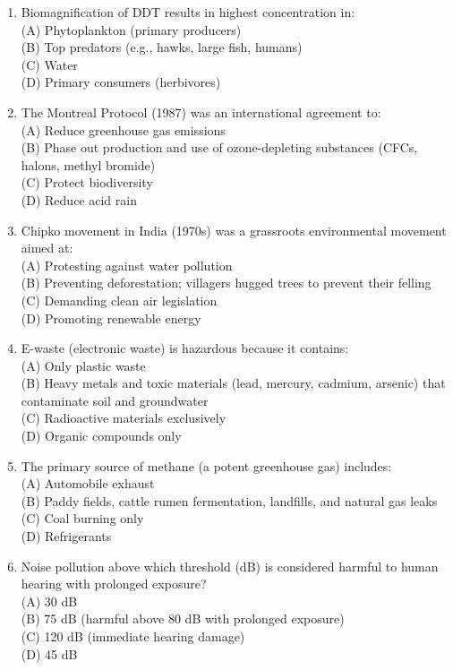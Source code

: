 \documentclass{article}
\begin{document}
\begin{enumerate}[label=Q\arabic*.]
\item Biomagnification of DDT results in highest concentration in:
\\(A) Phytoplankton (primary producers)
\\(B) Top predators (e.g., hawks, large fish, humans)
\\(C) Water
\\(D) Primary consumers (herbivores)

\item The Montreal Protocol (1987) was an international agreement to:
\\(A) Reduce greenhouse gas emissions
\\(B) Phase out production and use of ozone-depleting substances (CFCs, halons, methyl bromide)
\\(C) Protect biodiversity
\\(D) Reduce acid rain

\item Chipko movement in India (1970s) was a grassroots environmental movement aimed at:
\\(A) Protesting against water pollution
\\(B) Preventing deforestation; villagers hugged trees to prevent their felling
\\(C) Demanding clean air legislation
\\(D) Promoting renewable energy

\item E-waste (electronic waste) is hazardous because it contains:
\\(A) Only plastic waste
\\(B) Heavy metals and toxic materials (lead, mercury, cadmium, arsenic) that contaminate soil and groundwater
\\(C) Radioactive materials exclusively
\\(D) Organic compounds only

\item The primary source of methane (a potent greenhouse gas) includes:
\\(A) Automobile exhaust
\\(B) Paddy fields, cattle rumen fermentation, landfills, and natural gas leaks
\\(C) Coal burning only
\\(D) Refrigerants

\item Noise pollution above which threshold (dB) is considered harmful to human hearing with prolonged exposure?
\\(A) 30 dB
\\(B) 75 dB (harmful above 80 dB with prolonged exposure)
\\(C) 120 dB (immediate hearing damage)
\\(D) 45 dB


\end{enumerate}
\end{document}
